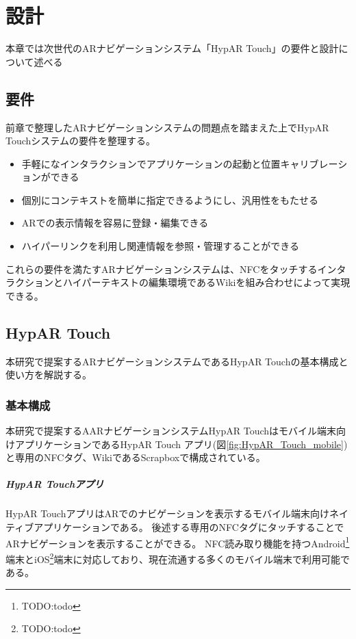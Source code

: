 \chapter{設計}
\label{chap:design}

本章では次世代のARナビゲーションシステム「HypAR Touch」の要件と設計について述べる

\newpage

\section{要件}
前章で整理したARナビゲーションシステムの問題点を踏まえた上でHypAR Touchシステムの要件を整理する。
\begin{itemize}
  \item 手軽になインタラクションでアプリケーションの起動と位置キャリブレーションができる
  \item 個別にコンテキストを簡単に指定できるようにし、汎用性をもたせる
  \item ARでの表示情報を容易に登録・編集できる
  \item ハイパーリンクを利用し関連情報を参照・管理することができる
\end{itemize}
これらの要件を満たすARナビゲーションシステムは、NFCをタッチするインタラクションとハイパーテキストの編集環境であるWikiを組み合わせによって実現できる。

\section{HypAR Touch}
本研究で提案するARナビゲーションシステムであるHypAR Touchの基本構成と使い方を解説する。

\subsection{基本構成}
本研究で提案するAARナビゲーションシステムHypAR Touchはモバイル端末向けアプリケーションであるHypAR Touch アプリ(図\ref{fig:HypAR_Touch_mobile})と専用のNFCタグ、WikiであるScrapboxで構成されている。

\paragraph*{HypAR Touchアプリ} 
HypAR TouchアプリはARでのナビゲーションを表示するモバイル端末向けネイティブアプリケーションである。
後述する専用のNFCタグにタッチすることでARナビゲーションを表示することができる。
NFC読み取り機能を持つAndroid\footnote{\textsf{TODO:todo}}端末とiOS\footnote{\textsf{TODO:todo}}端末に対応しており、現在流通する多くのモバイル端末で利用可能である。

